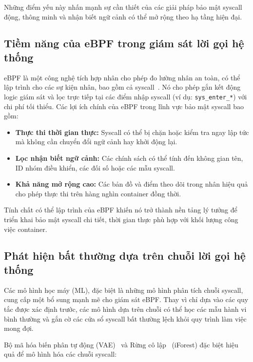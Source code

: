 Những điểm yếu này nhấn mạnh sự cần thiết của các giải pháp bảo mật syscall động, thông minh và nhận biết ngữ cảnh có thể mở rộng theo hạ tầng hiện đại.

\subsection{Tiềm năng của eBPF trong giám sát lời gọi hệ thống}
\label{subsec:ebpf}

eBPF là một công nghệ tích hợp nhân cho phép đo lường nhân an toàn, có thể lập trình cho các sự kiện nhân, bao gồm cả syscall~\cite{ref20_bpf_security}. Nó cho phép gắn kết động logic giám sát và lọc trực tiếp tại các điểm nhập syscall (ví dụ: \texttt{sys\_enter\_*}) với chi phí tối thiểu. Các lợi ích chính của eBPF trong lĩnh vực bảo mật syscall bao gồm:

\begin{itemize}
  \item \textbf{Thực thi thời gian thực:} Syscall có thể bị chặn hoặc kiểm tra ngay lập tức mà không cần
        chuyển đổi ngữ cảnh hay khởi động lại.
  \item \textbf{Lọc nhận biết ngữ cảnh:} Các chính sách có thể tính đến không gian tên, ID nhóm điều
        khiển, các đối số hoặc các mẫu syscall.
  \item \textbf{Khả năng mở rộng cao:} Các bản đồ và điểm theo dõi trong nhân hiệu quả cho phép thực thi
        trên hàng nghìn container đồng thời.
\end{itemize}

Tính chất có thể lập trình của eBPF khiến nó trở thành nền tảng lý tưởng để triển khai bảo mật syscall chi tiết, thời gian thực phù hợp với khối lượng công việc container.

\subsection{Phát hiện bất thường dựa trên chuỗi lời gọi hệ thống}
\label{subsec:sequence_anomaly}

Các mô hình học máy (ML), đặc biệt là những mô hình phân tích chuỗi syscall, cung cấp một bổ sung mạnh mẽ cho giám sát eBPF. Thay vì chỉ dựa vào các quy tắc được xác định trước, các mô hình dựa trên chuỗi có thể học các mẫu hành vi bình thường và gắn cờ các cửa sổ syscall bất thường lệch khỏi quy trình làm việc mong đợi.

Bộ mã hóa biến phân tự động (VAE)~\cite{vae_kingma} và Rừng cô lập~\cite{iforest_liu} (iForest) đặc biệt hiệu quả để mô hình hóa các chuỗi syscall:

